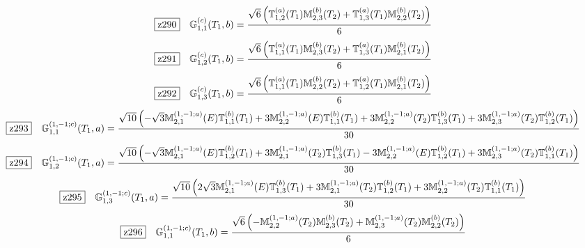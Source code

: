 \documentclass[fleqn,10pt,landscape]{jsarticle}
\begin{document}
\begin{dmath*}
\hspace*{3mm}\fbox{z290}\quad \mathbb{G}_{1,1}^{(c)}(T_{1},b)=\frac{\sqrt{6} \left(\mathbb{T}_{1,2}^{(a)}(T_{1}) \mathbb{M}_{2,3}^{(b)}(T_{2}) + \mathbb{T}_{1,3}^{(a)}(T_{1}) \mathbb{M}_{2,2}^{(b)}(T_{2})\right)}{6}
\end{dmath*}
\begin{dmath*}
\hspace*{3mm}\fbox{z291}\quad \mathbb{G}_{1,2}^{(c)}(T_{1},b)=\frac{\sqrt{6} \left(\mathbb{T}_{1,1}^{(a)}(T_{1}) \mathbb{M}_{2,3}^{(b)}(T_{2}) + \mathbb{T}_{1,3}^{(a)}(T_{1}) \mathbb{M}_{2,1}^{(b)}(T_{2})\right)}{6}
\end{dmath*}
\begin{dmath*}
\hspace*{3mm}\fbox{z292}\quad \mathbb{G}_{1,3}^{(c)}(T_{1},b)=\frac{\sqrt{6} \left(\mathbb{T}_{1,1}^{(a)}(T_{1}) \mathbb{M}_{2,2}^{(b)}(T_{2}) + \mathbb{T}_{1,2}^{(a)}(T_{1}) \mathbb{M}_{2,1}^{(b)}(T_{2})\right)}{6}
\end{dmath*}
\begin{dmath*}
\hspace*{3mm}\fbox{z293}\quad \mathbb{G}_{1,1}^{(1,-1;c)}(T_{1},a)=\frac{\sqrt{10} \left(- \sqrt{3} \mathbb{M}_{2,1}^{(1,-1;a)}(E) \mathbb{T}_{1,1}^{(b)}(T_{1}) + 3 \mathbb{M}_{2,2}^{(1,-1;a)}(E) \mathbb{T}_{1,1}^{(b)}(T_{1}) + 3 \mathbb{M}_{2,2}^{(1,-1;a)}(T_{2}) \mathbb{T}_{1,3}^{(b)}(T_{1}) + 3 \mathbb{M}_{2,3}^{(1,-1;a)}(T_{2}) \mathbb{T}_{1,2}^{(b)}(T_{1})\right)}{30}
\end{dmath*}
\begin{dmath*}
\hspace*{3mm}\fbox{z294}\quad \mathbb{G}_{1,2}^{(1,-1;c)}(T_{1},a)=\frac{\sqrt{10} \left(- \sqrt{3} \mathbb{M}_{2,1}^{(1,-1;a)}(E) \mathbb{T}_{1,2}^{(b)}(T_{1}) + 3 \mathbb{M}_{2,1}^{(1,-1;a)}(T_{2}) \mathbb{T}_{1,3}^{(b)}(T_{1}) - 3 \mathbb{M}_{2,2}^{(1,-1;a)}(E) \mathbb{T}_{1,2}^{(b)}(T_{1}) + 3 \mathbb{M}_{2,3}^{(1,-1;a)}(T_{2}) \mathbb{T}_{1,1}^{(b)}(T_{1})\right)}{30}
\end{dmath*}
\begin{dmath*}
\hspace*{3mm}\fbox{z295}\quad \mathbb{G}_{1,3}^{(1,-1;c)}(T_{1},a)=\frac{\sqrt{10} \left(2 \sqrt{3} \mathbb{M}_{2,1}^{(1,-1;a)}(E) \mathbb{T}_{1,3}^{(b)}(T_{1}) + 3 \mathbb{M}_{2,1}^{(1,-1;a)}(T_{2}) \mathbb{T}_{1,2}^{(b)}(T_{1}) + 3 \mathbb{M}_{2,2}^{(1,-1;a)}(T_{2}) \mathbb{T}_{1,1}^{(b)}(T_{1})\right)}{30}
\end{dmath*}
\begin{dmath*}
\hspace*{3mm}\fbox{z296}\quad \mathbb{G}_{1,1}^{(1,-1;c)}(T_{1},b)=\frac{\sqrt{6} \left(- \mathbb{M}_{2,2}^{(1,-1;a)}(T_{2}) \mathbb{M}_{2,3}^{(b)}(T_{2}) + \mathbb{M}_{2,3}^{(1,-1;a)}(T_{2}) \mathbb{M}_{2,2}^{(b)}(T_{2})\right)}{6}
\end{dmath*}
\end{document}
